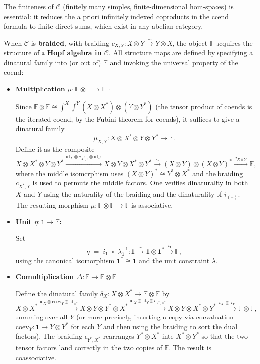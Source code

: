 \documentclass[11pt]{article}
\newcommand{\C}{\mathcal{C}}
\newcommand{\F}{\mathbb{F}}
\newcommand{\one}{\mathbf{1}}
\newcommand{\id}{\mathrm{id}}
\newcommand{\coev}{\mathrm{coev}}
\theoremstyle{definition}
\begin{document}
The finiteness of $\C$ (finitely many simples, finite-dimensional hom-spaces) is essential: it reduces the a priori infinitely indexed coproducts in the coend formula to finite direct sums, which exist in any abelian category.




When $\C$ is \textbf{braided}, with braiding $c_{X,Y} : X \otimes Y \xrightarrow{\sim} Y \otimes X$, the object $\F$ acquires the structure of a \textbf{Hopf algebra in $\C$}. All structure maps are defined by specifying a dinatural family into (or out of) $\F$ and invoking the universal property of the coend:


\begin{itemize}
\item \textbf{Multiplication }   $\mu : \F \otimes \F \to \F$ : 


Since $\F \otimes \F \cong \int^{X}\int^{Y} (X \otimes X^*) \otimes (Y \otimes Y^*)$ (the tensor product of coends is the iterated coend, by the Fubini theorem for coends), it suffices to give a dinatural family
\[
\mu_{X,Y} : X \otimes X^* \otimes Y \otimes Y^* \longrightarrow \F.
\]
Define it as the composite
\[
X \otimes X^* \otimes Y \otimes Y^*
\xrightarrow{\id_X \otimes c_{X^*, Y} \otimes \id_{Y^*}}
X \otimes Y \otimes X^* \otimes Y^*
\xrightarrow{\;\sim\;}
(X \otimes Y) \otimes (X \otimes Y)^*
\xrightarrow{\;i_{X \otimes Y}\;}
\F,
\]
where the middle isomorphism uses $(X \otimes Y)^* \cong Y^* \otimes X^*$ and the braiding $c_{X^*,Y}$ is used to permute the middle factors. One verifies dinaturality in both $X$ and $Y$ using the naturality of the braiding and the dinaturality of $i_{(\text{--})}$. The resulting morphism $\mu : \F \otimes \F \to \F$ is associative.


\item \textbf{Unit $\eta : \one \to \F$:}



Set
\[
\eta \;=\; i_{\one} \;\circ\; \lambda^{-1}_{\one} : \one \xrightarrow{\sim} \one \otimes \one^* \xrightarrow{\;i_{\one}\;} \F,
\]
using the canonical isomorphism $\one^* \cong \one$ and the unit constraint $\lambda$.



\item \textbf{Comultiplication $\Delta : \F \to \F \otimes \F$}

Define the dinatural family $\delta_X : X \otimes X^* \to \F \otimes \F$ by
\[
X \otimes X^*
\xrightarrow{\id_X \otimes \coev_Y \otimes \id_{X^*}}
X \otimes Y \otimes Y^* \otimes X^*
\xrightarrow{\id_X \otimes \id_Y \otimes c_{Y^*,X^*}}
X \otimes Y \otimes X^* \otimes Y^*
\xrightarrow{\;i_X \,\otimes\, i_Y\;}
\F \otimes \F,
\]
summing over all $Y$ (or more precisely, inserting a copy via coevaluation $\coev_Y : \one \to Y \otimes Y^*$ for each $Y$ and then using the braiding to sort the dual factors). The braiding $c_{Y^*,X^*}$ rearranges $Y^* \otimes X^*$ into $X^* \otimes Y^*$ so that the two tensor factors land correctly in the two copies of $\F$. The result is coassociative.


\end{itemize}
\end{document}
